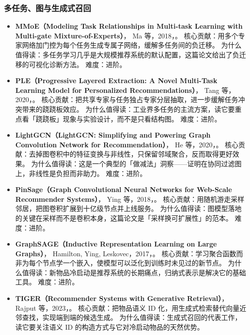 \subsubsection{多任务、图与生成式召回}

\begin{itemize}
  \item \textbf{MMoE（Modeling Task Relationships in Multi-task Learning with Multi-gate Mixture-of-Experts）}，
        Ma 等，2018，\cite{ma2018mmoe}。
        核心贡献：用多个专家网络加门控为每个任务生成专属子网络，缓解多任务间的负迁移。
        为什么值得读：多任务学习几乎是大规模推荐系统的默认配置，这篇论文给出了负迁移的可视化诊断方法。
        难度：进阶。
  \item \textbf{PLE（Progressive Layered Extraction: A Novel Multi-Task Learning Model for Personalized Recommendations）}，
        Tang 等，2020，\cite{tang2020ple}。
        核心贡献：把共享专家与任务独占专家分层抽取，进一步缓解任务冲突带来的跷跷板效应。
        为什么值得读：工业界多任务的主流方案，读它要重点看「跷跷板」现象与实验设计，而不是只看结构图。
        难度：进阶。
  \item \textbf{LightGCN（LightGCN: Simplifying and Powering Graph Convolution Network for Recommendation）}，
        He 等，2020，\cite{he2020lightgcn}。
        核心贡献：去掉图卷积中的特征变换与非线性，只保留邻域聚合，反而取得更好效果。
        为什么值得读：这是一个典型的「做减法」洞察——证明在协同过滤图上，非线性是负担而非助力。
        难度：进阶。
  \item \textbf{PinSage（Graph Convolutional Neural Networks for Web-Scale Recommender Systems）}，
        Ying 等，2018，\cite{ying2018pinsage}。
        核心贡献：用随机游走采样邻居，把图卷积扩展到十亿级节点并上线服务。
        为什么值得读：图模型落地的关键在采样而不是卷积本身，这篇论文是「采样换可扩展性」的范本。
        难度：进阶。
  \item \textbf{GraphSAGE（Inductive Representation Learning on Large Graphs）}，
        Hamilton, Ying, Leskovec，2017，\cite{hamilton2017graphsage}。
        核心贡献：学习聚合函数而非为每个节点学一个嵌入，使模型可以泛化到训练时未见过的新节点。
        为什么值得读：新物品冷启动是推荐系统的长期痛点，归纳式表示是解决它的基础工具。
        难度：进阶。
  \item \textbf{TIGER（Recommender Systems with Generative Retrieval）}，
        Rajput 等，2023，\cite{rajput2023tiger}。
        核心贡献：把物品语义 ID 化，用生成式检索替代向量近邻查找，实现端到端的候选生成。
        为什么值得读：生成式召回的代表工作，读它要关注语义 ID 的构造方式与它对冷启动物品的天然优势。

\end{itemize}
